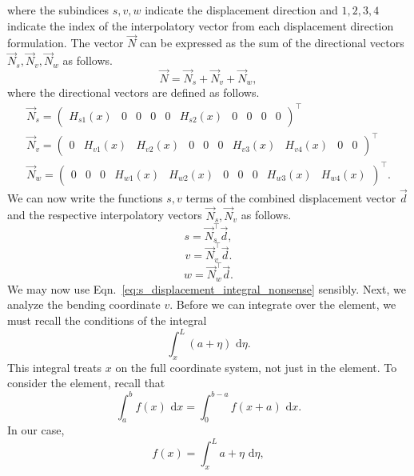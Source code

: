 where the subindices $s,v,w$ indicate the displacement direction and $1,2,3,4$ indicate the index of the interpolatory vector from each displacement direction formulation. The vector $\vec N$ can be expressed as the sum of the directional vectors $\vec{N}_s,\vec{N}_v,\vec{N}_w$ as follows.
\begin{equation}
\vec{N} = \vec{N}_s + \vec{N}_v + \vec{N}_w,
\end{equation}
where the directional vectors are defined as follows.
\begin{eqnarray}
\vec{N}_s =
\begin{pmatrix}
H_{s1}(x) & 0 & 0 & 0 & 0 & H_{s2}(x) & 0 & 0 & 0 & 0
\end{pmatrix}^\top \\
\vec{N}_v =
\begin{pmatrix}
0 & H_{v1}(x) & H_{v2}(x) & 0 & 0 & 0 & H_{v3}(x) & H_{v4}(x) & 0 & 0
\end{pmatrix}^\top \\
\vec{N}_w =
\begin{pmatrix}
0 & 0 & 0 & H_{w1}(x) & H_{w2}(x) & 0 & 0 & 0 & H_{w3}(x) & H_{w4}(x)
\end{pmatrix}^\top .
\end{eqnarray}
We can now write the functions $s,v$ terms of the combined displacement vector $\vec d$ and the respective interpolatory vectors $\vec N_s,\vec N_v$ as follows.
\begin{equation}
s = \vec N_s^\top \vec d,
\end{equation}
\begin{equation}
v = \vec N_v^\top \vec d.
\end{equation}
\begin{equation}
w = \vec N_w^\top \vec d.
\end{equation}
We may now use Eqn.~\ref{eq:s_displacement_integral_nonsense} sensibly. Next, we analyze the bending coordinate $v$. Before we can integrate over the element, we must recall the conditions of the integral 
\begin{equation}
\int_x^L(a+\eta)\text{ d}\eta.
\end{equation}
This integral treats $x$ on the full coordinate system, not just in the element. To consider the element, recall that
\begin{equation}
\int_a^bf(x)\text{ d}x = \int_0^{b-a}f(x+a)\text{ d}x.
\end{equation}
In our case,
\begin{equation}
f(x) = \int_x^L a+\eta\text{ d}\eta,
\end{equation}
